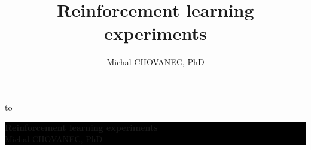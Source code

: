 \documentclass[xcolor=dvipsnames]{beamer}
\title{\color{white} \bf Reinforcement learning experiments}
\author{\color{white} Michal CHOVANEC, PhD}
\date[EURP]{}
\begin{document}
{
    \usebackgroundtemplate
    {
        \vbox to 
    }
    \begin{frame}



    \centering
     \colorbox{black}
     {
        \begin{minipage}{7cm}
           {\LARGE \color{white} \bf Reinforcement learning experiments} \\
           {\LARGE \color{white} Michal CHOVANEC, PhD} \\
       \end{minipage}
     }


    \end{frame}
}
\end{document}
